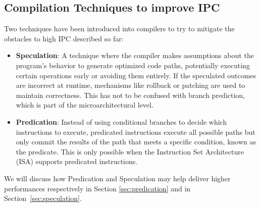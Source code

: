 \subsection{Compilation Techniques to improve IPC}
Two techniques have been introduced into compilers to try to mitigate the obstacles to high IPC described so far:

\begin{itemize}
    \item \textbf{Speculation}: A technique where the compiler makes assumptions about the program’s behavior to generate optimized code paths, potentially executing certain operations early or avoiding them entirely. If the speculated outcomes are incorrect at runtime, mechanisms like rollback or patching are used to maintain correctness. This has not to be confused with branch prediction, which is part of the microarchitectural level.
    \item \textbf{Predication}: Instead of using conditional branches to decide which instructions to execute, predicated instructions execute all possible paths but only commit the results of the path that meets a specific condition, known as the predicate. This is only possible when the Instruction Set Architecture (ISA) supports predicated instructions.
\end{itemize} 

We will discuss how Predication and Speculation may help deliver higher performances respectively in Section \ref{sec:predication} and in Section~\ref{sec:speculation}.

\newpage
